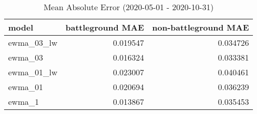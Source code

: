 \begin{table}
\centering
\caption{Mean Absolute Error (2020-05-01 - 2020-10-31)}
\begin{tabular}{lrr}
\toprule
      model &  battleground MAE &  non-battleground MAE \\
\midrule
 ewma\_03\_lw &          0.019547 &              0.034726 \\
    ewma\_03 &          0.016324 &              0.033381 \\
 ewma\_01\_lw &          0.023007 &              0.040461 \\
    ewma\_01 &          0.020694 &              0.036239 \\
     ewma\_1 &          0.013867 &              0.035453 \\
\bottomrule
\end{tabular}
\end{table}
